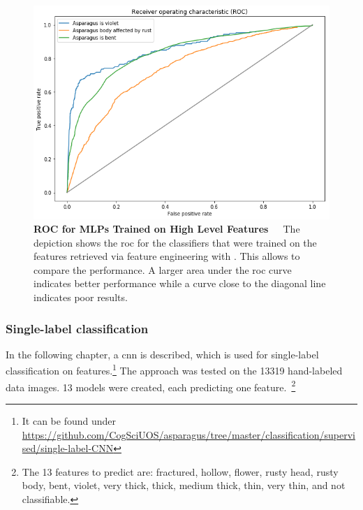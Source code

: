 \begin{figure}[!htb]
	\centering
	\includegraphics[scale=0.6]{Figures/chapter04/fe_roc.png}
	\caption[Feature Engineering ROC Curve]{\textbf{ROC for MLPs Trained on High Level Features}~~~The depiction shows the \acrfull{roc} for the classifiers that were trained on the features retrieved via feature engineering with . This allows to compare the performance. A larger area under the \acrshort{roc} curve indicates better performance while a curve close to the diagonal line indicates poor results.}
	\label{fig:FeatureEngineeringROC}
\end{figure}


\subsubsection{Single-label classification}
\label{subsec:SingleLabel}

In the following chapter, a \acrlong{cnn} is described, which is used for single-label classification on features.\footnote{It can be found under \url{https://github.com/CogSciUOS/asparagus/tree/master/classification/supervised/single-label-CNN}} The approach was tested on the 13319 hand-labeled data images. 13 models were created, each predicting one feature.~\footnote{The 13 features to predict are: fractured, hollow, flower, rusty head, rusty body, bent, violet, very thick, thick, medium thick, thin, very thin, and not classifiable.}

